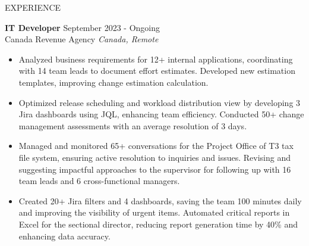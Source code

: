 \documentclass{resume} %
\begin{document}

\begin{rSection}{EXPERIENCE}

\textbf{IT Developer} \hfill September 2023 - Ongoing\\
Canada Revenue Agency \hfill \textit{Canada, Remote}
 \begin{itemize}
    \itemsep -3pt {} 
    \item Analyzed business requirements for 12+ internal applications, coordinating with 14 team leads to document effort estimates. Developed new estimation templates, improving change estimation calculation.
    \item Optimized release scheduling and workload distribution view by developing 3 Jira dashboards using JQL, enhancing team efficiency. Conducted 50+ change management assessments with an average resolution of 3 days.
    \item Managed and monitored 65+ conversations for the Project Office of T3 tax file system, ensuring active resolution to inquiries and issues. Revising and suggesting impactful approaches to the supervisor for following up with 16 team leads and 6 cross-functional managers. 
    \item Created 20+ Jira filters and 4 dashboards, saving the team 100 minutes daily and improving the visibility of urgent items. Automated critical reports in Excel for the sectional director, reducing report generation time by 40\% and enhancing data accuracy.
 \end{itemize}




\end{rSection}
\end{document}
